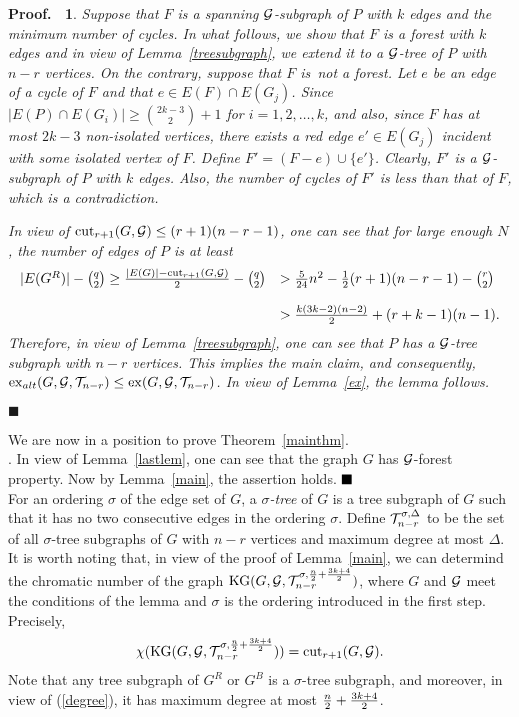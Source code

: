 \documentclass[11pt]{article}
\newtheorem{preproof}{{\bf Proof.\ }}
\newenvironment{proof}[1]{\begin{preproof}{\rm
               #1}\hfill{$\blacksquare$}}{\end{preproof}}
\begin{document}
\begin{proof}
{Suppose 
that $F$ is a spanning ${\cal G}$-subgraph of $P$ with $k$ edges and the minimum number of cycles. 
In what follows, we show that 
$F$ is a forest with $k$ edges and in view of Lemma~\ref{treesubgraph}, we extend it to a ${\cal G}$-tree of $P$ with $n-r$ vertices.  On the contrary, suppose that $F$ is~not a forest.  Let 
$e$ be an edge of a cycle of $F$ and that $e\in E(F)\cap E(G_{j})$. 
Since $|E(P)\cap E(G_i)|\geq {2k-3\choose 2}+1$ for $i=1,2,\ldots,k$, and also, 
since $F$ has at most $2k-3$ non-isolated vertices, there exists a red edge $e'\in E(G_{j})$ incident with some isolated vertex of $F$. 
Define 
$F'=(F- e)\cup \{e'\}$. Clearly, $F'$ is a ${\cal G}$-subgraph of $P$ with $k$ edges. Also, the number of cycles of $F'$ is less than that of $F$,  which is a contradiction. 

In view of ${\rm cut}_{r+1}(G,{\cal G})\leq (r+1)(n-r-1)$, one can see that 
for large enough $N$, the number of edges of $P$ is at least 
$$
\begin{array}{ll}
|E(G^R)|-{q\choose 2}\geq {|E(G)|-{\rm cut}_{r+1}(G,{\cal G})\over 2}-{q\choose 2} &> {5\over 24}n^2-{1\over 2}(r+1)(n-r-1)-{r\choose 2}\\
&\\
& > {k(3k-2)(n-2)\over 2}+ (r+k-1)(n-1). 
\end{array}
$$ 
Therefore, in view of Lemma~\ref{treesubgraph}, one can see that $P$ has a ${\cal G}$-tree subgraph with $n-r$ vertices. This implies the main claim, 
and consequently, 
${\rm ex}_{alt}(G,{\cal G},{\cal T}_{n-r})\leq {\rm ex}(G,{\cal G},{\cal T}_{n-r})$. In view of 
Lemma~\ref{ex}, the lemma follows. 
}\end{proof}
We are now in a position to prove Theorem~\ref{mainthm}. \\

. In view of Lemma~\ref{lastlem}, one can see that the graph $G$ has ${\cal G}$-forest property. Now by Lemma~\ref{main}, the assertion holds. 
$\hfill \blacksquare$\\


For an ordering $\sigma$ of the edge set of $G$, a 
{\it $\sigma$-tree} of $G$ is a tree subgraph of $G$ such that it has no two consecutive edges in the ordering $\sigma$.  
Define ${\cal T}_{n-r}^{\sigma, \Delta}$ to be the set of all $\sigma$-tree subgraphs of $G$ with $n-r$ vertices and maximum degree at most 
$\Delta$. It is worth noting that, in view of the proof of 
Lemma~\ref{main}, we can determind the chromatic number of 
the graph ${\rm KG}(G, {\cal G}, {\cal T}_{n-r}^{\sigma, {n\over 2}+{3k+4\over 2}})$, where $G$ and ${\cal G}$ meet the conditions of the lemma 
and $\sigma$ is the ordering introduced in the first step. 
Precisely,   
$$\chi({\rm KG}(G, {\cal G}, {\cal T}_{n-r}^{\sigma, {n\over 2}+{3k+4\over 2}}))={\rm cut}_{r+1}(G, {\cal G}).$$
Note that any tree subgraph of $G^R$ or $G^B$ is a $\sigma$-tree subgraph, and moreover, in view of (\ref{degree}), it has maximum degree at most ${n\over 2}+{3k+4\over 2}$. 
\end{document}

